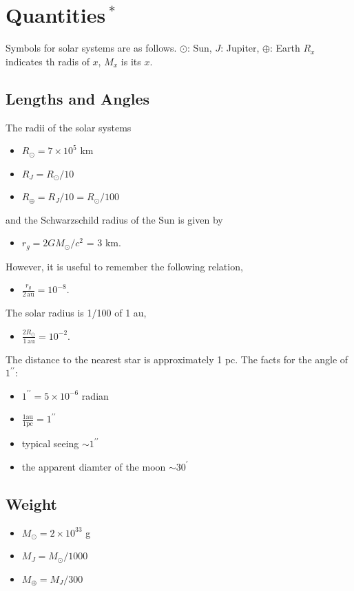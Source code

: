\section{Quantities$\,^\ast$}
Symbols for solar systems are as follows. $\odot$: Sun, $J$: Jupiter, $\oplus$: Earth
$R_x$ indicates th radis of $x$, $M_x$ is its $x$.

\subsection*{Lengths and Angles}
The radii of the solar systems
\begin{itemize}
    \item $R_\odot = 7 \times 10^5$ km
    \item $R_J = R_\odot/10$
    \item $R_\oplus = R_J/10 = R_\odot/100$
\end{itemize}
and the Schwarzschild radius of the Sun is given by
\begin{itemize}
   \item $r_g = 2 G M_\odot/c^2$ = 3 km.
\end{itemize}
However, it is useful to remember the following relation,
\begin{itemize}
    \item $\displaystyle{\frac{r_g}{2 \, \mathrm{au}}} = 10^{-8}$.
\end{itemize}
The solar radius is 1/100 of 1 au,
\begin{itemize}
    \item $\displaystyle{\frac{2 R_\odot}{1 \, \mathrm{au}}} = 10^{-2}$.
\end{itemize}
The distance to the nearest star is approximately 1 pc. The facts for the angle of $1^{\prime \prime}$: 
\begin{itemize}
    \item $1^{\prime\prime} = 5 \times 10^{-6}$ radian
    \item $\displaystyle{\frac{1 \mathrm{au}}{1 \mathrm{pc}}} = 1^{\prime\prime}$ \\
    \item typical seeing $\sim 1^{\prime\prime}$
    \item the apparent diamter of the moon $\sim 30^{\prime}$
\end{itemize}

\subsection*{Weight}

\begin{itemize}
    \item $M_\odot = 2 \times 10^{33}$ g
    \item $M_J = M_\odot/1000$
    \item $M_\oplus = M_J/300$
\end{itemize}

